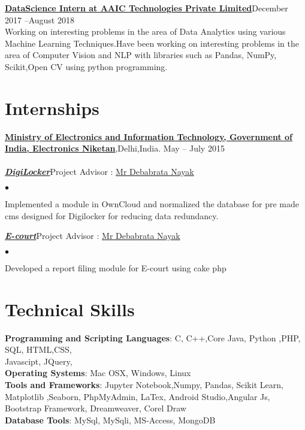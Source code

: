 \documentclass[margin,line]{res}
\newenvironment{list2}{
  \begin{list}{$\bullet$}{%
      \setlength{\itemsep}{0in}
      \setlength{\parsep}{0in} \setlength{\parskip}{0in}
      \setlength{\topsep}{0in} \setlength{\partopsep}{0in}
      \setlength{\leftmargin}{0.2in}}}{\end{list}}
\begin{document}
\begin{resume}
{\bf  \href{https://www.appliedaicourse.com/}{ DataScience Intern at AAIC Technologies Private Limited}}\hfill {December 2017 --August 2018}\\
Working on interesting problems in the area of Data Analytics using  various  Machine Learning Techniques.Have been working on interesting problems in the area of Computer Vision and NLP with libraries such as Pandas, NumPy, Scikit,Open CV using python programming.\\

\section{\sc Internships}
{\bf 
\href{http://meity.gov.in/}{ Ministry of Electronics and Information Technology, Government of India, Electronics Niketan}},Delhi,India. \hfill{May -- July 2015}\\\\
{\em \bf \href{https://digilocker.gov.in/}{DigiLocker}}\hfill {Project Advisor : \href {https://www.linkedin.com/in/debabrata-nayak-a911397b/}{ Mr Debabrata Nayak}}
\begin{list2} %
\item  Implemented a module in OwnCloud  and normalized the database for pre made cms designed for Digilocker for reducing data  redundancy.\\
\end{list2}
{\em \bf \href{http://www.ecourts.gov.in/ecourts_home/}{E-court}}\hfill {Project Advisor : \href {https://www.linkedin.com/in/debabrata-nayak-a911397b/}{ Mr Debabrata Nayak}}
\begin{list2} %
\item Developed a report filing module for E-court using cake php \\
\end{list2}

\section{\sc Technical Skills}
{\bf Programming and Scripting Languages}:  C, C++,Core Java, Python ,PHP, SQL, HTML,CSS,\\Javascipt, JQuery,  \\
{\bf Operating Systems}: Mac OSX, Windows, Linux\\
{\bf Tools and Frameworks}: Jupyter Notebook,Numpy, Pandas, Scikit Learn, Matplotlib ,Seaborn, PhpMyAdmin, LaTex, Android Studio,Angular Js,  Bootstrap Framework, Dreamweaver, Corel Draw \\
{\bf Database Tools}:  MySql, MySqli, MS-Access, MongoDB\\\\\\


\end{resume}
\end{document}
